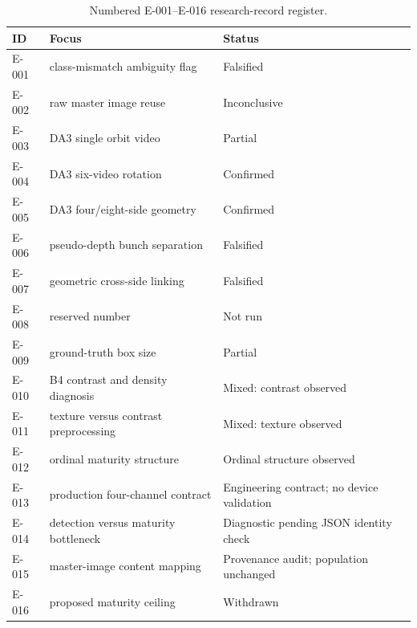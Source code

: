 \begin{table}[t]
\centering\small
\caption{Numbered E-001--E-016 research-record register.}
\label{tab:register}
\begin{tabularx}{\textwidth}{L{0.10\textwidth}@{\hspace{0.8em}}L{0.40\textwidth}@{\hspace{0.8em}}Y}
\toprule
\textbf{ID} & \textbf{Focus} & \textbf{Status}\\
\midrule
E-001 & class-mismatch ambiguity flag & Falsified\\
E-002 & raw master image reuse & Inconclusive\\
E-003 & DA3 single orbit video & Partial\\
E-004 & DA3 six-video rotation & Confirmed\\
E-005 & DA3 four/eight-side geometry & Confirmed\\
E-006 & pseudo-depth bunch separation & Falsified\\
E-007 & geometric cross-side linking & Falsified\\
E-008 & reserved number & Not run\\
E-009 & ground-truth box size & Partial\\
E-010 & B4 contrast and density diagnosis & Mixed: contrast observed\\
E-011 & texture versus contrast preprocessing & Mixed: texture observed\\
E-012 & ordinal maturity structure & Ordinal structure observed\\
E-013 & production four-channel contract & Engineering contract; no device validation\\
E-014 & detection versus maturity bottleneck & Diagnostic pending JSON identity check\\
E-015 & master-image content mapping & Provenance audit; population unchanged\\
E-016 & proposed maturity ceiling & Withdrawn\\
\bottomrule
\end{tabularx}
\end{table}

